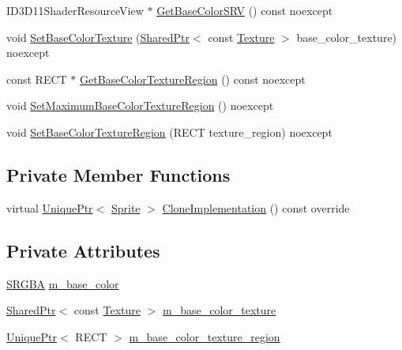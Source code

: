 \begin{DoxyCompactItemize}
\item 
I\+D3\+D11\+Shader\+Resource\+View $\ast$ \hyperlink{classmage_1_1_sprite_image_a955225e8274ae5f39f6eb6f6fbb75638}{Get\+Base\+Color\+S\+RV} () const noexcept
\item 
void \hyperlink{classmage_1_1_sprite_image_a9fb3a39de1350e58b4019b541337ca13}{Set\+Base\+Color\+Texture} (\hyperlink{namespacemage_a1e01ae66713838a7a67d30e44c67703e}{Shared\+Ptr}$<$ const \hyperlink{classmage_1_1_texture}{Texture} $>$ base\+\_\+color\+\_\+texture) noexcept
\item 
const R\+E\+CT $\ast$ \hyperlink{classmage_1_1_sprite_image_afd401746e4466bf7849acb373675527c}{Get\+Base\+Color\+Texture\+Region} () const noexcept
\item 
void \hyperlink{classmage_1_1_sprite_image_aa08a58d1e94f8e26031b97b56b0c8c6a}{Set\+Maximum\+Base\+Color\+Texture\+Region} () noexcept
\item 
void \hyperlink{classmage_1_1_sprite_image_aa68e416669d05cf777c564b118b50fe5}{Set\+Base\+Color\+Texture\+Region} (R\+E\+CT texture\+\_\+region) noexcept
\end{DoxyCompactItemize}
\subsection*{Private Member Functions}
\begin{DoxyCompactItemize}
\item 
virtual \hyperlink{namespacemage_a3316d7143a973e37adf1110f2e80ca31}{Unique\+Ptr}$<$ \hyperlink{classmage_1_1_sprite}{Sprite} $>$ \hyperlink{classmage_1_1_sprite_image_ad6460971fc4ffb425b7a43d27c9b05b2}{Clone\+Implementation} () const override
\end{DoxyCompactItemize}
\subsection*{Private Attributes}
\begin{DoxyCompactItemize}
\item 
\hyperlink{structmage_1_1_s_r_g_b_a}{S\+R\+G\+BA} \hyperlink{classmage_1_1_sprite_image_aa83cc38aa8a84e8fc434232b4223c236}{m\+\_\+base\+\_\+color}
\item 
\hyperlink{namespacemage_a1e01ae66713838a7a67d30e44c67703e}{Shared\+Ptr}$<$ const \hyperlink{classmage_1_1_texture}{Texture} $>$ \hyperlink{classmage_1_1_sprite_image_a92f5b052561ca7d8fb317b8479d820a2}{m\+\_\+base\+\_\+color\+\_\+texture}
\item 
\hyperlink{namespacemage_a3316d7143a973e37adf1110f2e80ca31}{Unique\+Ptr}$<$ R\+E\+CT $>$ \hyperlink{classmage_1_1_sprite_image_ab921e099c41323969c86f7bac9c81f4f}{m\+\_\+base\+\_\+color\+\_\+texture\+\_\+region}
\end{DoxyCompactItemize}

